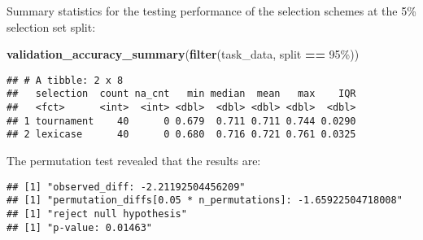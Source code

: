 \documentclass[
]{book}
\newenvironment{Shaded}{\begin{snugshade}}{\end{snugshade}}
\newcommand{\AttributeTok}[1]{\textcolor[rgb]{0.13,0.29,0.53}{#1}}
\newcommand{\DecValTok}[1]{\textcolor[rgb]{0.00,0.00,0.81}{#1}}
\newcommand{\FunctionTok}[1]{\textcolor[rgb]{0.13,0.29,0.53}{\textbf{#1}}}
\newcommand{\NormalTok}[1]{#1}
\newcommand{\OtherTok}[1]{\textcolor[rgb]{0.56,0.35,0.01}{#1}}
\newcommand{\SpecialCharTok}[1]{\textcolor[rgb]{0.81,0.36,0.00}{\textbf{#1}}}
\newcommand{\StringTok}[1]{\textcolor[rgb]{0.31,0.60,0.02}{#1}}
\begin{document}
Summary statistics for the testing performance of the selection schemes at the 5\% selection set split:

\begin{Shaded}
\begin{Highlighting}[]
\FunctionTok{validation\_accuracy\_summary}\NormalTok{(}\FunctionTok{filter}\NormalTok{(task\_data, split }\SpecialCharTok{==} \StringTok{\textquotesingle{}95\%\textquotesingle{}}\NormalTok{))}
\end{Highlighting}
\end{Shaded}

\begin{verbatim}
## # A tibble: 2 x 8
##   selection  count na_cnt   min median  mean   max    IQR
##   <fct>      <int>  <int> <dbl>  <dbl> <dbl> <dbl>  <dbl>
## 1 tournament    40      0 0.679  0.711 0.711 0.744 0.0290
## 2 lexicase      40      0 0.680  0.716 0.721 0.761 0.0325
\end{verbatim}

The permutation test revealed that the results are:

\begin{Shaded}
\end{Shaded}

\begin{verbatim}
## [1] "observed_diff: -2.21192504456209"
## [1] "permutation_diffs[0.05 * n_permutations]: -1.65922504718008"
## [1] "reject null hypothesis"
## [1] "p-value: 0.01463"
\end{verbatim}
\end{document}
